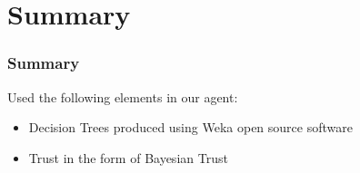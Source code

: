 \section{Summary}
\begin{frame}
\frametitle{Summary}

Used the following elements in our agent:
\begin{itemize}
  \item Decision Trees produced using Weka open source software
  \item Trust in the form of Bayesian Trust
\end{itemize}

\end{frame}